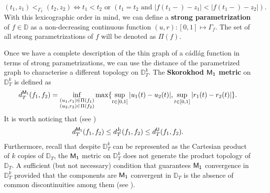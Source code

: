 \documentclass[]{amsart}
\numberwithin{equation}{section}
\theoremstyle{remark}
\theoremstyle{definition}
\begin{document}
\begin{equation*}
	(t_1,z_1) <_{\Gamma_x} (t_2,z_2) \Leftrightarrow t_1<t_2 \mbox{ or } (t_1=t_2 \mbox{ and } |f(t_1-)-z_1|<|f(t_1-)-z_2|).
\end{equation*}
With this lexicographic order in mind, we can define a \textbf{strong parametrization} of $f \in \mathbb{D}$ as a non-decreasing continuous function $(u,r):[0,1] \mapsto \Gamma_f$. The set of all strong parametrizations of $f$ will be denoted as $\Pi(f)$.

Once we have a complete description of the thin graph of a c\'adl\'ag function in terms of strong parametrizations, we can use the distance of the parametrized graph to characterise a different topology on $\mathbb{D}^k_T$. The \textbf{Skorokhod ${\sf M_1}$ metric} on $\mathbb{D}^k_T$ is defined as
\begin{equation*}
	d^{\sf M_1}_T(f_1,f_2)=\inf_{\substack{(u_1,r_1) \in \Pi(f_1)\\ (u_2,r_2) \in \Pi(f_2)}}\max\{\sup_{t \in [0,1]}|u_1(t)-u_2(t)|, \sup_{t \in [0,1]}|r_1(t)-r_2(t)|\}.
\end{equation*}  
It is worth noticing that (see \cite[Theorem 12.3.2]{whitt2002stochastic})
\begin{equation*}
	d^{\sf M_1}_T(f_1,f_2)\le d^{\sf J_1}_T(f_1,f_2) \le d^{\sf U}_T(f_1,f_2).
\end{equation*}
Furthermore, recall that despite $\mathbb{D}^k_T$ can be represented as the Cartesian product of $k$ copies of $\mathbb{D}_T$, the ${\sf M_1}$ metric on $\mathbb{D}^k_T$ does not generate the product topology of $\mathbb{D}_T$. A sufficient (but not necessary) condition that guarantees ${\sf M_1}$ convergence in $\mathbb{D}^k_T$ provided that the components are ${\sf M_1}$ convergent in $\mathbb{D}_T$ is the absence of common discontinuities among them (see \cite[Theorem 12.6.1]{whitt2002stochastic}).
\end{document}
